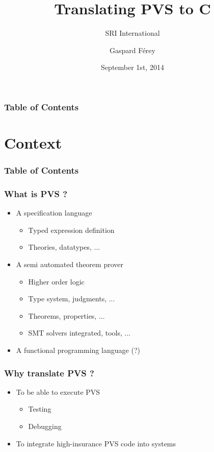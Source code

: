 \documentclass{beamer}
\title[From PVS to C]{Translating PVS to C}
\subtitle{SRI International}
\author[Gaspard Férey]{Gaspard Férey}
\institute{Ecole Polytechnique}
\date{September 1st, 2014}
\begin{document}
\frame{\titlepage}

\begin{frame}
\frametitle{Table of Contents}
\tableofcontents
\end{frame}


\section{Context}

\begin{frame}
\frametitle{Table of Contents}
\tableofcontents[currentsection]
\end{frame}


\begin{frame}
\frametitle{What is PVS ?}

\begin{itemize}
\itemsep2em
\item A specification language
\begin{itemize}
\item Typed expression definition
\item Theories, datatypes, ...
\end{itemize}
\item A semi automated theorem prover
\begin{itemize}
\item Higher order logic
\item Type system, judgments, ...
\item Theorems, properties, ...
\item SMT solvers integrated, tools, ...
\end{itemize}
\item A functional programming language (?)
\end{itemize}

\end{frame}


\begin{frame}
\frametitle{Why translate PVS ?}

\begin{itemize}
\itemsep2em
\item To be able to execute PVS
\begin{itemize}
\item Testing
\item Debugging
\end{itemize}
\item To integrate high-insurance PVS code into systems
\end{itemize}

\end{frame}
\end{document}
